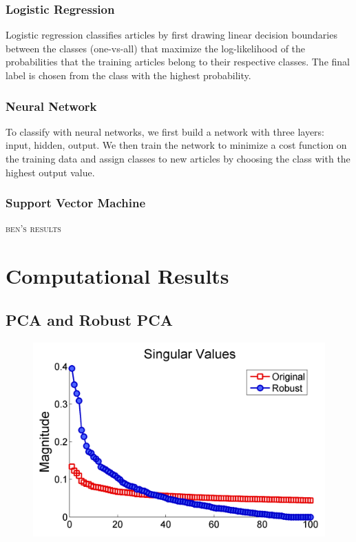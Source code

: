 \documentclass[12pt]{article}
\newcommand{\comment}[1]{\textsc{\color[rgb]{1,0,0}#1}}
\begin{document}
\subsubsection{Logistic Regression}

Logistic regression classifies articles by first drawing linear decision
boundaries between the classes (one-vs-all) that maximize the log-likelihood of the probabilities that the training articles belong to their respective classes. The final label is chosen from the class with the highest probability.

\subsubsection{Neural Network}

To classify with neural networks, we first build a network with three
layers: input, hidden, output. We then train the network to minimize a cost function on the training data and assign classes to new articles by choosing the class with the highest output value.

\subsubsection{Support Vector Machine}

\comment{ben's results}

\section{Computational Results}

\subsection{PCA and Robust PCA}
\begin{figure}[H]
\centering
\includegraphics[width=.6\textwidth]{figures/singularvaluescompare}
\end{figure}
\end{document}
